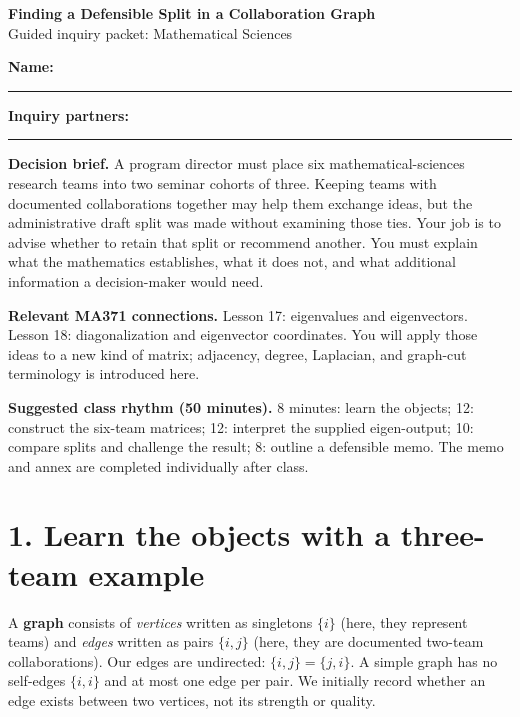 \documentclass[10pt,letterpaper]{article}
\begin{document}
\begin{center}
{\Large\bfseries Finding a Defensible Split in a Collaboration Graph}\\
{\large Guided inquiry packet: Mathematical Sciences}
\end{center}
\textbf{Name:} \rule{2.4in}{0.4pt}\hfill
\textbf{Inquiry partners:} \rule{2.25in}{0.4pt}

\textbf{Decision brief.} A program director must place six mathematical-sciences research teams into two seminar cohorts of three. Keeping teams with documented collaborations together may help them exchange ideas, but the administrative draft split was made without examining those ties. Your job is to advise whether to retain that split or recommend another. You must explain what the mathematics establishes, what it does not, and what additional information a decision-maker would need.

\textbf{Relevant MA371 connections.} Lesson 17: eigenvalues and eigenvectors. Lesson 18: diagonalization and eigenvector coordinates. You will apply those ideas to a new kind of matrix; adjacency, degree, Laplacian, and graph-cut terminology is introduced here.

\textbf{Suggested class rhythm (50 minutes).} 8 minutes: learn the objects; 12: construct the six-team matrices; 12: interpret the supplied eigen-output; 10: compare splits and challenge the result; 8: outline a defensible memo. The memo and annex are completed individually after class.

\section*{1. Learn the objects with a three-team example}
A \textbf{graph} consists of \emph{vertices} written as singletons $\{i\}$ (here, they represent teams) and \emph{edges} written as pairs $\{i,j\}$ (here, they are documented two-team collaborations). Our edges are undirected: $\{i,j\}=\{j,i\}$. A simple graph has no self-edges $\{i,i\}$ and at most one edge per pair. We initially record whether an edge exists between two vertices, not its strength or quality.
\end{document}
